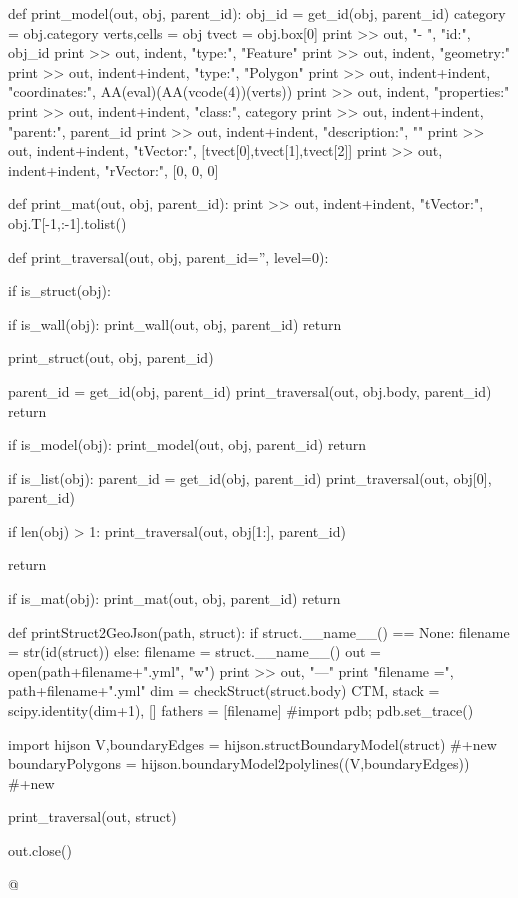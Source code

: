 \documentclass[11pt,oneside]{article}	%
\begin{document}
{def print_model(out, obj, parent_id):
	obj_id = get_id(obj, parent_id)
	category = obj.category
	verts,cells = obj
	tvect = obj.box[0]
	print >> out, "-   ", "id:", obj_id
	print >> out, indent, "type:", "Feature"
	print >> out, indent, "geometry:" 
	print >> out, indent+indent, "type:", "Polygon"
	print >> out, indent+indent, "coordinates:", AA(eval)(AA(vcode(4))(verts))
	print >> out, indent, "properties:"
	print >> out, indent+indent, "class:", category
	print >> out, indent+indent, "parent:", parent_id
	print >> out, indent+indent, "description:", ""
	print >> out, indent+indent, "tVector:", [tvect[0],tvect[1],tvect[2]]
	print >> out, indent+indent, "rVector:", [0, 0, 0]

def print_mat(out, obj, parent_id):
	print >> out, indent+indent, "tVector:", obj.T[-1,:-1].tolist()


def print_traversal(out, obj, parent_id='', level=0): 

	if is_struct(obj):

		if is_wall(obj):
			print_wall(out, obj, parent_id)
			return

		print_struct(out, obj, parent_id)

		parent_id = get_id(obj, parent_id)
		print_traversal(out, obj.body, parent_id)
		return

	if is_model(obj):
		print_model(out, obj, parent_id)
		return

	if is_list(obj):
		parent_id = get_id(obj, parent_id)      
		print_traversal(out, obj[0], parent_id)
		
		if len(obj) > 1:
			print_traversal(out, obj[1:], parent_id)
	
		return
	
	if is_mat(obj):
		print_mat(out, obj, parent_id)
		return

def printStruct2GeoJson(path, struct):
	if struct.__name__() == None:
		filename = str(id(struct))
	else: 
		filename = struct.__name__()
	out = open(path+filename+".yml", "w")
	print >> out, "---"
	print "filename =", path+filename+".yml"
	dim = checkStruct(struct.body)
	CTM, stack = scipy.identity(dim+1), []
	fathers = [filename]
	#import pdb; pdb.set_trace()

	import hijson
	V,boundaryEdges = hijson.structBoundaryModel(struct)   #+new
	boundaryPolygons = hijson.boundaryModel2polylines((V,boundaryEdges))  #+new
	
	print_traversal(out, struct) 

	out.close()
   
@}
\end{document}
